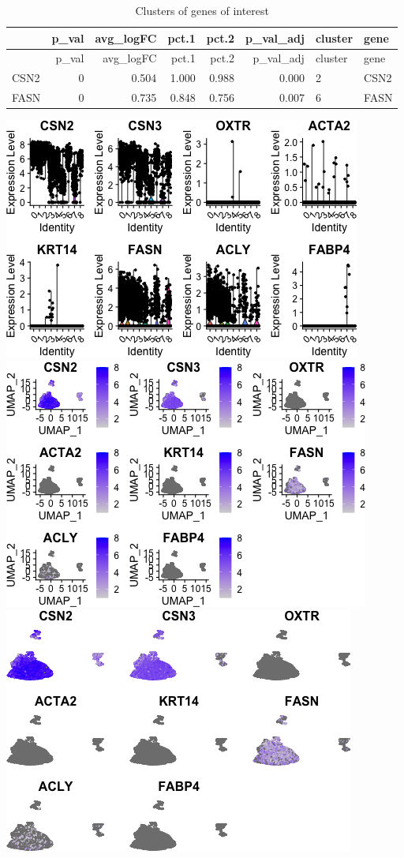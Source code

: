 \documentclass[]{article}
\begin{document}
\begin{longtable}[]{@{}lrrrrrll@{}}
\caption{Clusters of genes of interest}\tabularnewline
\toprule
& p\_val & avg\_logFC & pct.1 & pct.2 & p\_val\_adj & cluster &
gene\tabularnewline
\midrule
\endfirsthead
\toprule
& p\_val & avg\_logFC & pct.1 & pct.2 & p\_val\_adj & cluster &
gene\tabularnewline
\midrule
\endhead
CSN2 & 0 & 0.504 & 1.000 & 0.988 & 0.000 & 2 & CSN2\tabularnewline
FASN & 0 & 0.735 & 0.848 & 0.756 & 0.007 & 6 & FASN\tabularnewline
\bottomrule
\end{longtable}

\includegraphics{figures/feature-analysis-1.png}
\includegraphics{figures/feature-analysis-2.png}
\includegraphics{figures/feature-analysis-3.png}
\end{document}
